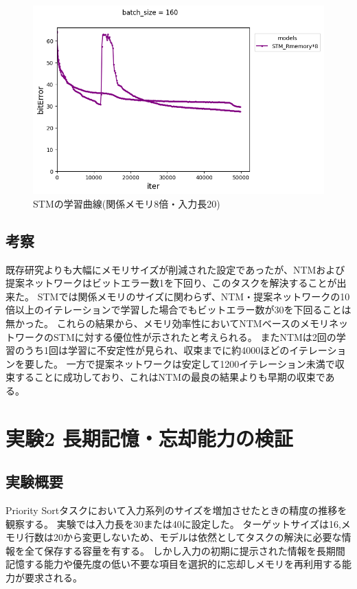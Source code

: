 \begin{figure}[t]
	\centering
	\includegraphics[width=\linewidth]{./figure/priority/samx8l20.png}
	\caption{STMの学習曲線(関係メモリ8倍・入力長20)}
	\label{fig:priority_samx8_l20}
\end{figure}

\subsection{考察}
既存研究よりも大幅にメモリサイズが削減された設定であったが、NTMおよび提案ネットワークはビットエラー数1を下回り、このタスクを解決することが出来た。
STMでは関係メモリのサイズに関わらず、NTM・提案ネットワークの10倍以上のイテレーションで学習した場合でもビットエラー数が30を下回ることは無かった。
これらの結果から、メモリ効率性においてNTMベースのメモリネットワークのSTMに対する優位性が示されたと考えられる。
またNTMは2回の学習のうち1回は学習に不安定性が見られ、収束までに約4000ほどのイテレーションを要した。
一方で提案ネットワークは安定して1200イテレーション未満で収束することに成功しており、これはNTMの最良の結果よりも早期の収束である。

\section{実験2 長期記憶・忘却能力の検証}
\subsection{実験概要}
Priority Sortタスクにおいて入力系列のサイズを増加させたときの精度の推移を観察する。
実験では入力長を30または40に設定した。
ターゲットサイズは16,メモリ行数は20から変更しないため、モデルは依然としてタスクの解決に必要な情報を全て保存する容量を有する。
しかし入力の初期に提示された情報を長期間記憶する能力や優先度の低い不要な項目を選択的に忘却しメモリを再利用する能力が要求される。

